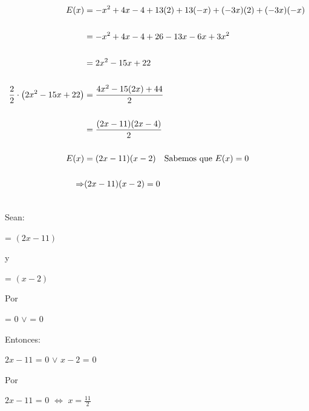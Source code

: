 \documentclass[12pt]{article}
\begin{document}
\begin{equation*}
    \begin{split}
      E(x) & =-x^{2} + 4x-4 + 13(2)+13(-x)+(-3x)(2)+(-3x)(-x)\\\\ 
      & =-x^{2} + 4x-4 + 26-13x-6x+3x^{2} \\\\
      & = 2x^{2}-15x + 22\\\\ 
      \frac{2}{2}\cdot\left(2x^{2}-15x + 22\right) & = \frac{4x^{2}-15(2x) + 44}{2} \\\\
      & = \frac{(2x-11)(2x-4)}{2} \\\\
E(x) & = (2x-11)(x-2) \quad \textup{Sabemos que $E(x)= 0$}\\\\
      \Rightarrow & (2x-11)(x-2) = 0 \\\\
    \end{split}
\end{equation*}

Sean: 
\begin{center}
   {} = $(2x-11)$   
\end{center}

\begin{center}
    y
\end{center}

\begin{center}
   {} = $(x-2)$   
\end{center}
    
Por {}
\begin{center}
   {} = $0$  $\vee$ {} = $0$   
\end{center}

Entonces:

\begin{center}
   
   $2x-11$ = $0$  $\vee$ $x-2$ = $0$   
   
\end{center}

Por {}

\begin{center}
   
   $2x-11$  = $0$ $\Leftrightarrow$ $ x=\frac{11}{2} $ 
   
\end{center}
\end{document}
